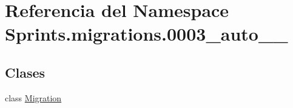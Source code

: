 \hypertarget{namespace_sprints_1_1migrations_1_10003__auto__20160610__2303}{}\section{Referencia del Namespace Sprints.\+migrations.0003\+\_\+auto\+\_\+\_}
\label{namespace_sprints_1_1migrations_1_10003__auto__20160610__2303}
\subsection*{Clases}
\begin{DoxyCompactItemize}
\item 
class \hyperlink{class_sprints_1_1migrations_1_10003__auto__20160610__2303_1_1_migration}{Migration}
\end{DoxyCompactItemize}
